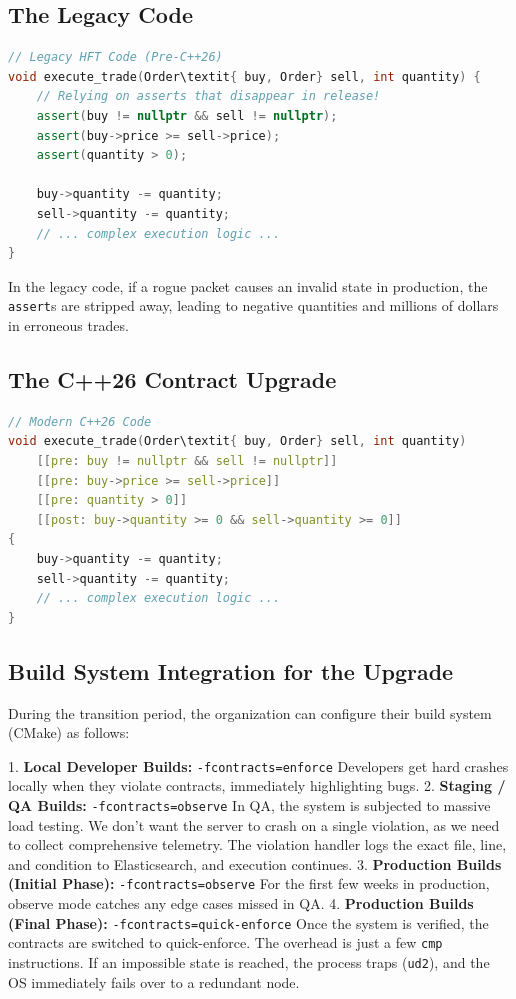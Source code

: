 {{{{{{{{\subsection{The Legacy Code}

\begin{lstlisting}[language=C++]
// Legacy HFT Code (Pre-C++26)
void execute_trade(Order\textit{ buy, Order} sell, int quantity) {
    // Relying on asserts that disappear in release!
    assert(buy != nullptr && sell != nullptr);
    assert(buy->price >= sell->price);
    assert(quantity > 0);
    
    buy->quantity -= quantity;
    sell->quantity -= quantity;
    // ... complex execution logic ...
}
\end{lstlisting}

In the legacy code, if a rogue packet causes an invalid state in production, the \texttt{assert}s are stripped away, leading to negative quantities and millions of dollars in erroneous trades.

\subsection{The C++26 Contract Upgrade}

\begin{lstlisting}[language=C++]
// Modern C++26 Code
void execute_trade(Order\textit{ buy, Order} sell, int quantity)
    [[pre: buy != nullptr && sell != nullptr]]
    [[pre: buy->price >= sell->price]]
    [[pre: quantity > 0]]
    [[post: buy->quantity >= 0 && sell->quantity >= 0]]
{
    buy->quantity -= quantity;
    sell->quantity -= quantity;
    // ... complex execution logic ...
}
\end{lstlisting}

\subsection{Build System Integration for the Upgrade}

During the transition period, the organization can configure their build system (CMake) as follows:

1. \textbf{Local Developer Builds:} \texttt{-fcontracts=enforce} 
   Developers get hard crashes locally when they violate contracts, immediately highlighting bugs.
2. \textbf{Staging / QA Builds:} \texttt{-fcontracts=observe}
   In QA, the system is subjected to massive load testing. We don't want the server to crash on a single violation, as we need to collect comprehensive telemetry. The violation handler logs the exact file, line, and condition to Elasticsearch, and execution continues.
3. \textbf{Production Builds (Initial Phase):} \texttt{-fcontracts=observe}
   For the first few weeks in production, observe mode catches any edge cases missed in QA.
4. \textbf{Production Builds (Final Phase):} \texttt{-fcontracts=quick-enforce}
   Once the system is verified, the contracts are switched to quick-enforce. The overhead is just a few \texttt{cmp} instructions. If an impossible state is reached, the process traps (\texttt{ud2}), and the OS immediately fails over to a redundant node.

}}}}}}}}
